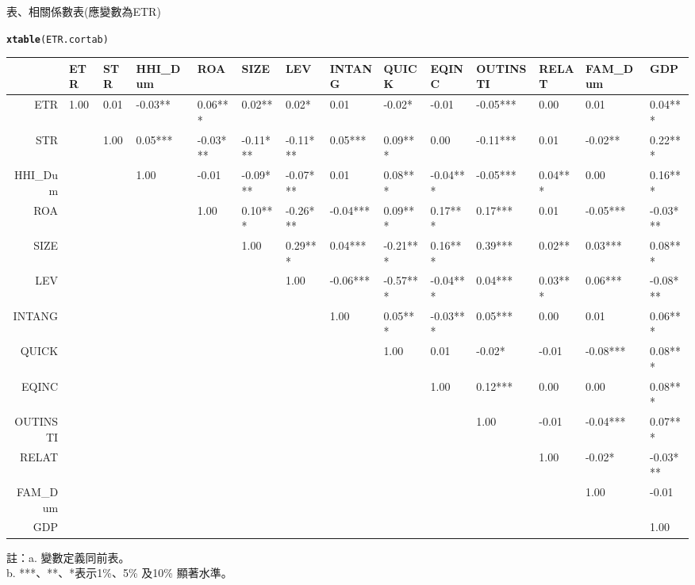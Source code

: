 \documentclass[a4paper,14pt]{article}\usepackage[]{graphicx}\usepackage[]{color}
\makeatletter
\newcommand{\hlstd}[1]{\textcolor[rgb]{0.345,0.345,0.345}{#1}}%
\newcommand{\hlkwd}[1]{\textcolor[rgb]{0.737,0.353,0.396}{\textbf{#1}}}%
\newenvironment{kframe}{%
 \def\at@end@of@kframe{}%
 \ifinner\ifhmode%
  \def\at@end@of@kframe{\end{minipage}}%
  \begin{minipage}{\columnwidth}%
 \fi\fi%
 \def\FrameCommand##1{\hskip\@totalleftmargin \hskip-\fboxsep
 \colorbox{shadecolor}{##1}\hskip-\fboxsep
     \hskip-\linewidth \hskip-\@totalleftmargin \hskip\columnwidth}%
 \MakeFramed {\advance\hsize-\width
   \@totalleftmargin\z@ \linewidth\hsize
   \@setminipage}}%
 {\par\unskip\endMakeFramed%
 \at@end@of@kframe}
\makeatother
\begin{document}
\newpage
\begin{landscape}
\thispagestyle{empty}
\centerline{表、相關係數表(應變數為ETR)}
\begin{kframe}
\begin{alltt}
 \hlkwd{xtable}\hlstd{(ETR.cortab)}
\end{alltt}
\end{kframe}%
\begin{table}[ht]
\centering
\begin{tabular}{rlllllllllllll}
  \hline
 & ETR & STR & HHI\_Dum & ROA & SIZE & LEV & INTANG & QUICK & EQINC & OUTINSTI & RELAT & FAM\_Dum & GDP \\ 
  \hline
ETR &  1.00  &  0.01    & -0.03**  &  0.06*** &  0.02**  &  0.02*   &  0.01    & -0.02*   & -0.01    & -0.05*** &  0.00    &  0.01    &  0.04*** \\ 
  STR &  &  1.00  &  0.05*** & -0.03*** & -0.11*** & -0.11*** &  0.05*** &  0.09*** &  0.00    & -0.11*** &  0.01    & -0.02**  &  0.22*** \\ 
  HHI\_Dum &  &  &  1.00  & -0.01    & -0.09*** & -0.07*** &  0.01    &  0.08*** & -0.04*** & -0.05*** &  0.04*** &  0.00    &  0.16*** \\ 
  ROA &  &  &  &  1.00  &  0.10*** & -0.26*** & -0.04*** &  0.09*** &  0.17*** &  0.17*** &  0.01    & -0.05*** & -0.03*** \\ 
  SIZE &  &  &  &  &  1.00  &  0.29*** &  0.04*** & -0.21*** &  0.16*** &  0.39*** &  0.02**  &  0.03*** &  0.08*** \\ 
  LEV &  &  &  &  &  &  1.00  & -0.06*** & -0.57*** & -0.04*** &  0.04*** &  0.03*** &  0.06*** & -0.08*** \\ 
  INTANG &  &  &  &  &  &  &  1.00  &  0.05*** & -0.03*** &  0.05*** &  0.00    &  0.01    &  0.06*** \\ 
  QUICK &  &  &  &  &  &  &  &  1.00  &  0.01    & -0.02*   & -0.01    & -0.08*** &  0.08*** \\ 
  EQINC &  &  &  &  &  &  &  &  &  1.00  &  0.12*** &  0.00    &  0.00    &  0.08*** \\ 
  OUTINSTI &  &  &  &  &  &  &  &  &  &  1.00  & -0.01    & -0.04*** &  0.07*** \\ 
  RELAT &  &  &  &  &  &  &  &  &  &  &  1.00  & -0.02*   & -0.03*** \\ 
  FAM\_Dum &  &  &  &  &  &  &  &  &  &  &  &  1.00  & -0.01    \\ 
  GDP &  &  &  &  &  &  &  &  &  &  &  &  &  1.00  \\ 
   \hline
\end{tabular}
\end{table}

註：a. 變數定義同前表。\\
    b. ***、**、*表示1\%、5\% 及10\% 顯著水準。\\
\end{landscape}
\end{document}
